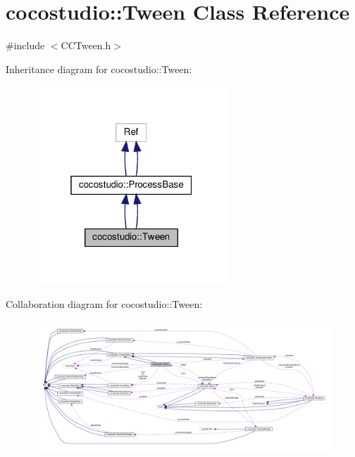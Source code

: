 \hypertarget{classcocostudio_1_1Tween}{}\section{cocostudio\+:\+:Tween Class Reference}
\label{classcocostudio_1_1Tween}


{\ttfamily \#include $<$C\+C\+Tween.\+h$>$}



Inheritance diagram for cocostudio\+:\+:Tween\+:
\nopagebreak
\begin{figure}[H]
\begin{center}
\leavevmode
\includegraphics[width=208pt]{classcocostudio_1_1Tween__inherit__graph}
\end{center}
\end{figure}


Collaboration diagram for cocostudio\+:\+:Tween\+:
\nopagebreak
\begin{figure}[H]
\begin{center}
\leavevmode
\includegraphics[width=350pt]{classcocostudio_1_1Tween__coll__graph}
\end{center}
\end{figure}

